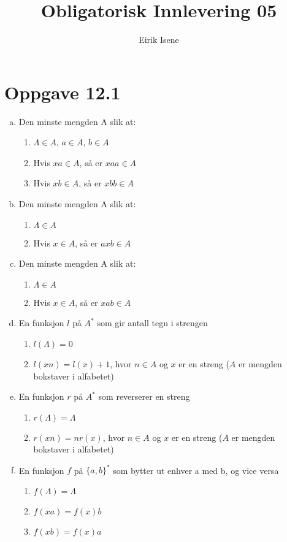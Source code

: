 \documentclass[norsk, 12p]{article}
\title{Obligatorisk Innlevering 05}
\author{Eirik Isene}
\begin{document}
\maketitle

\section{Oppgave 12.1} %
\label{sec:oppgave_12_1}
\begin{enumerate}[a)]
    \item Den minste mengden A slik at:
    \begin{enumerate}[1.]
        \item $\Lambda \in A$, $a \in A$, $b \in A$
        \item Hvis $xa \in A$, så er $xaa \in A$
        \item Hvis $xb \in A$, så er $xbb \in A$
    \end{enumerate}
    \item Den minste mengden A slik at:
    \begin{enumerate}[1.]
        \item $\Lambda \in A$
        \item Hvis $x \in A$, så er $axb \in A$
    \end{enumerate}
    \item Den minste mengden A slik at:
    \begin{enumerate}[1.]
        \item $\Lambda \in A$
        \item Hvis $x \in A$, så er $xab \in A$
    \end{enumerate}
    \item En funksjon $l$ på $A^*$ som gir antall tegn i strengen
    \begin{enumerate}[1.]
        \item $l(\Lambda) = 0$
        \item $l(xn) = l(x) + 1$, hvor $n \in A$ og $x$ er en streng ($A$ er mengden bokstaver i alfabetet)
    \end{enumerate} 
    \item En funksjon $r$ på $A^*$ som reverserer en streng
    \begin{enumerate}[1.]
        \item $r(\Lambda) = \Lambda$
        \item $r(xn) = nr(x)$, hvor $n \in A$ og $x$ er en streng ($A$ er mengden bokstaver i alfabetet)
    \end{enumerate}
    \item En funksjon $f$ på $\{a,b\}^*$ som bytter ut enhver a med b, og vice versa
    \begin{enumerate}[1.]
        \item $f(\Lambda) = \Lambda$
        \item $f(xa) = f(x)b$
        \item $f(xb) = f(x)a$
    \end{enumerate}
\end{enumerate}
\end{document}
